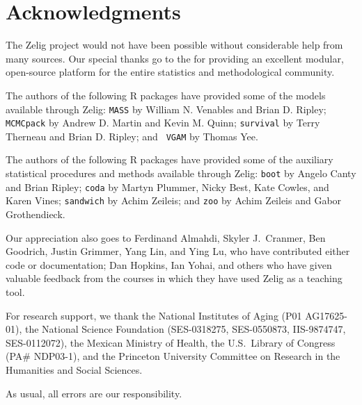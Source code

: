\section*{Acknowledgments}  

The Zelig project would not have been possible without considerable
help from many sources.  Our special thanks go to the  for providing an
excellent modular, open-source platform for the entire statistics and
methodological community.

The authors of the following R packages have provided some of the
models available through Zelig: {\tt MASS} by William N. Venables and
Brian D. Ripley; {\tt MCMCpack} by Andrew D. Martin and Kevin M.
Quinn; {\tt survival} by Terry Therneau and Brian D. Ripley; and {\tt
  VGAM} by Thomas Yee.  

The authors of the following R packages have provided some of the
auxiliary statistical procedures and methods available through Zelig:
{\tt boot} by Angelo Canty and Brian Ripley; {\tt coda} by Martyn
Plummer, Nicky Best, Kate Cowles, and Karen Vines; {\tt sandwich} by
Achim Zeileis; and {\tt zoo} by Achim Zeileis and Gabor Grothendieck.

Our appreciation also goes to Ferdinand Almahdi, Skyler J.\ Cranmer,
Ben Goodrich, Justin Grimmer, Yang Lin, and Ying Lu, who have
contributed either code or documentation; Dan Hopkins, Ian Yohai, and
others who have given valuable feedback from the courses in which they
have used Zelig as a teaching tool.

For research support, we thank the National Institutes of Aging (P01
AG17625-01), the National Science Foundation (SES-0318275,
SES-0550873, IIS-9874747, SES-0112072), the Mexican Ministry of
Health, the U.S.\ Library of Congress (PA\# NDP03-1), and the
Princeton University Committee on Research in the Humanities and
Social Sciences.

As usual, all errors are our responsibility.


